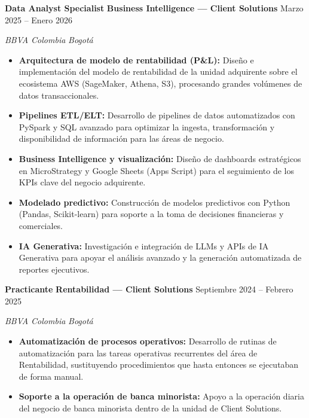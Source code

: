 \documentclass[letterpaper,10pt]{article}
\newcommand{\sizeTitle}  {\fontsize{10.6}{12.7}\selectfont}
\newcommand{\sizeContact}{\fontsize{9}{11}\selectfont}
\newcommand{\sizeWhere}  {\fontsize{9.5}{11.4}\selectfont}
\newcommand{\md}{\,\textperiodcentered\,}                  %
\newcommand{\cvrole}[2]{%
  \needspace{3\baselineskip}%
  {\color{cvdark}\sizeTitle\bfseries #1}%
  \hfill{\color{cvgray}\sizeContact #2}\par
  \vspace{1pt}%
}
\newcommand{\cvwhere}[1]{%
  {\color{cvgray}\sizeWhere\itshape #1}\par
  \vspace{3pt}%
}
\begin{document}
\cvrole{Data Analyst Specialist\md Business Intelligence --- Client Solutions}{Marzo 2025 -- Enero 2026}
\cvwhere{BBVA Colombia\md Bogotá}
\begin{itemize}
  \item \textbf{Arquitectura de modelo de rentabilidad (P\&L):} Diseño e
        implementación del modelo de rentabilidad de la unidad adquirente sobre
        el ecosistema AWS (SageMaker, Athena, S3), procesando grandes volúmenes
        de datos transaccionales.
  \item \textbf{Pipelines ETL/ELT:} Desarrollo de pipelines de datos automatizados
        con PySpark y SQL avanzado para optimizar la ingesta, transformación y
        disponibilidad de información para las áreas de negocio.
  \item \textbf{Business Intelligence y visualización:} Diseño de dashboards
        estratégicos en MicroStrategy y Google Sheets (Apps Script) para el
        seguimiento de los KPIs clave del negocio adquirente.
  \item \textbf{Modelado predictivo:} Construcción de modelos predictivos con
        Python (Pandas, Scikit-learn) para soporte a la toma de decisiones
        financieras y comerciales.
  \item \textbf{IA Generativa:} Investigación e integración de LLMs y APIs de IA
        Generativa para apoyar el análisis avanzado y la generación automatizada
        de reportes ejecutivos.
\end{itemize}
\vspace{7pt}

\cvrole{Practicante\md Rentabilidad --- Client Solutions}{Septiembre 2024 -- Febrero 2025}
\cvwhere{BBVA Colombia\md Bogotá}
\begin{itemize}
  \item \textbf{Automatización de procesos operativos:} Desarrollo de rutinas de
        automatización para las tareas operativas recurrentes del área de
        Rentabilidad, sustituyendo procedimientos que hasta entonces se
        ejecutaban de forma manual.
  \item \textbf{Soporte a la operación de banca minorista:} Apoyo a la operación
        diaria del negocio de banca minorista dentro de la unidad de Client
        Solutions.
\end{itemize}
\vspace{7pt}
\end{document}
